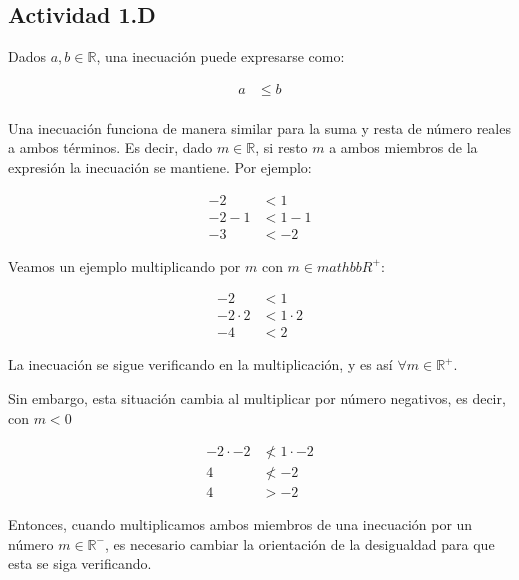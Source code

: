 \subsection*{Actividad 1.D}

Dados $a, b \in \mathbb{R}$, una inecuación puede expresarse como:

\begin{align*}
	a &\leq b\\
\end{align*}

Una inecuación funciona de manera similar para la suma y resta de número reales a ambos términos. Es decir, dado $m \in \mathbb{R}$, si resto $m$ a ambos miembros de la expresión la inecuación se mantiene. Por ejemplo:

\begin{align*}
	-2 &< 1\\
	-2 - 1 &< 1 - 1\\
	-3 &< -2
\end{align*}

Veamos un ejemplo multiplicando por $m$ con $m \in mathbb{R^+}$:


\begin{align*}
	-2 &< 1\\
	-2 \cdot 2 &< 1 \cdot 2\\
	-4 &< 2
\end{align*}

La inecuación se sigue verificando en la multiplicación, y es así $\forall m \in \mathbb{R^+}$.

Sin embargo, esta situación cambia al multiplicar por número negativos, es decir, con $m < 0$

\begin{align*}
	-2 \cdot -2 &\not < 1 \cdot -2\\
	4 &\not < -2\\
	4 &> -2
\end{align*}

Entonces, cuando multiplicamos ambos miembros de una inecuación por un número $m \in \mathbb{R^-}$, es necesario cambiar la orientación de la desigualdad para que esta se siga verificando.
